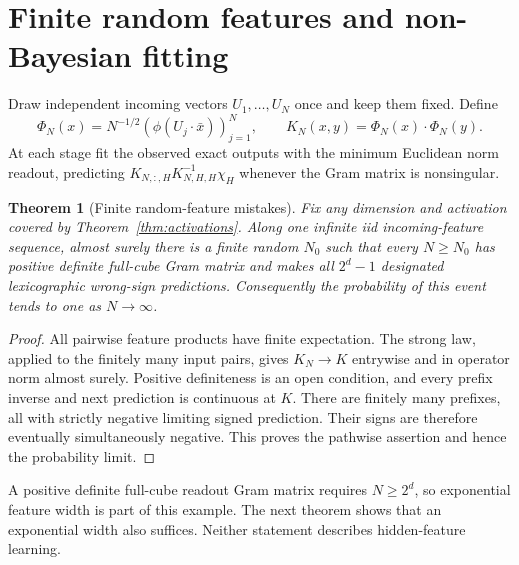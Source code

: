 \documentclass[11pt]{article}
\newtheorem{theorem}{Theorem}\newtheorem{lemma}[theorem]{Lemma}
\begin{document}
\section{Finite random features and non-Bayesian fitting}
Draw independent incoming vectors $U_1,\ldots,U_N$ once and keep them
fixed. Define
\[
 \Phi_N(x)=N^{-1/2}(\phi(U_j\cdot\bar x))_{j=1}^N,
                  \qquad K_N(x,y)=\Phi_N(x)\cdot\Phi_N(y).
\]
At each stage fit the observed exact outputs with the minimum Euclidean
norm readout, predicting
$K_{N,:,H}K_{N,H,H}^{-1}\chi_H$ whenever the Gram matrix is nonsingular.

\begin{theorem}[Finite random-feature mistakes]
Fix any dimension and activation covered by Theorem~\ref{thm:activations}.
Along one infinite iid incoming-feature sequence, almost surely there
is a finite random $N_0$ such that every $N\ge N_0$ has positive definite
full-cube Gram matrix and makes all $2^d-1$ designated lexicographic
wrong-sign predictions. Consequently the probability of this event
tends to one as $N\to\infty$.
\end{theorem}
\begin{proof}
All pairwise feature products have finite expectation. The strong law,
applied to the finitely many input pairs, gives $K_N\to K$ entrywise
and in operator norm almost surely. Positive definiteness is an open
condition, and every prefix inverse and next prediction is continuous
at $K$. There are finitely many prefixes, all with strictly negative
limiting signed prediction. Their signs are therefore eventually
simultaneously negative. This proves the pathwise assertion and hence
the probability limit.
\end{proof}
A positive definite full-cube readout Gram matrix requires $N\ge2^d$,
so exponential feature width is part of this example. The next theorem
shows that an exponential width also suffices. Neither statement describes
hidden-feature learning.
\end{document}
